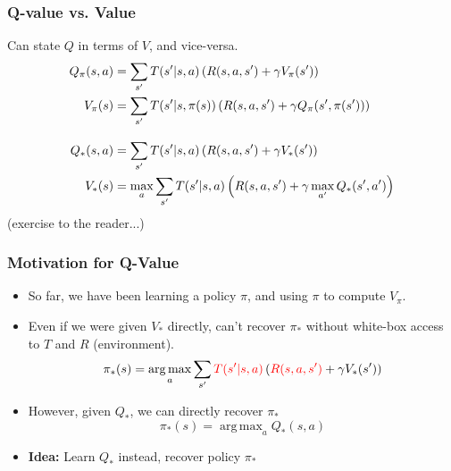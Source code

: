 \documentclass[10pt,a4paper, handout]{beamer}
\DeclareMathOperator*{\argmax}{arg\,max}
\newcommand{\red}[1]{\textcolor{red}{#1}}
\begin{document}
\begin{frame}
	\frametitle{Q-value vs. Value}
	
Can state $Q$ in terms of $V$, and vice-versa.
\begin{align*}
Q_\pi(s,a) &= \sum_{s'} T(s' | s,a) \left( R(s,a,s') + \gamma V_\pi(s') \right) \\
V_\pi(s) &= \sum_{s'} T(s' | s, \pi(s)) \left( R(s,a,s') 
	+ \gamma Q_\pi(s', \pi(s')) \right) \\
	\intertext{\quad}
	Q_*(s,a) &= \sum_{s'} T(s' | s,a) \left( R(s,a,s') + \gamma V_*(s') \right) \\
	V_*(s) &= \max_a \sum_{s'} T(s' | s, a) \left( R(s,a,s') 
	+ \gamma \max_{a'} Q_*(s', a') \right) \\
\end{align*}
\pause
(exercise to the reader...)

\end{frame}


\begin{frame}
	\frametitle{Motivation for Q-Value}
\begin{itemize}
\item So far, we have been learning a policy $\pi$, and using
$\pi$ to compute $V_\pi$.
\pause
\item Even if we were given $V_*$ directly,
can't recover $\pi_*$ without white-box access to $T$ and $R$ (environment).
$$
\pi_*(s) = \argmax_a \sum_{s'} \red{T(s'| s, a)} \left( 
\red{R(s,a,s')} + 
\gamma V_*(s') \right)
$$  \pause
		\item However, given $Q_*$, we can directly recover $\pi_*$
		$$
		\pi_*(s) = \argmax_a Q_*(s,a)
		$$
		\pause
		\item \textbf{Idea:} Learn $Q_*$ instead, recover policy $\pi_*$
\end{itemize}
\end{frame}
\end{document}
